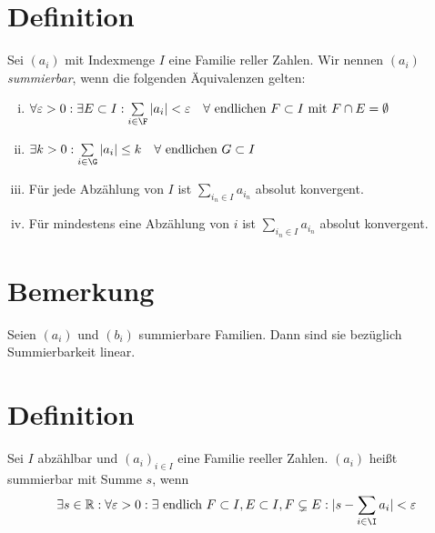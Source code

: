 \documentclass{scrreprt}
\newcommand{\RR}{\mathbb{R}}
\begin{document}
   	\section{Definition}
   	Sei $(a_i)$ mit Indexmenge $I$ eine Familie reller Zahlen. Wir nennen $(a_i)$ \emph{summierbar}, wenn die folgenden Äquivalenzen gelten:
	\begin{enumerate}[i)]
   		\item
   		$\forall \varepsilon > 0: \exists E \subset I: \sum\limits_{i \in \F} \vert a_i \vert < \varepsilon ~~~ \forall \text{ endlichen } F \subset I \text{ mit } F \cap E = \emptyset$
   		\item
   		$\exists k > 0 : \sum\limits_{i \in \G} \vert a_i \vert \leq k ~~~ \forall \text{ endlichen } G \subset I$
   		\item
   		Für jede Abzählung von $I$ ist $\sum\limits_{i_n \in I} a_{i_n}$ absolut konvergent.
   		\item
   		Für mindestens eine Abzählung von $i$ ist $\sum\limits_{i_n \in I} a_{i_n}$ absolut konvergent.
   	\end{enumerate}

   	\section{Bemerkung}
   	Seien $(a_i)$ und $(b_i)$ summierbare Familien. Dann sind sie bezüglich Summierbarkeit linear.

   	\section{Definition}
   	Sei $I$ abzählbar und $(a_i)_{i \in I}$ eine Familie reeller Zahlen. $(a_i)$ heißt summierbar mit Summe $s$, wenn
   	\begin{align*}
   		\exists s \in \RR: \forall \varepsilon > 0: \exists \text{ endlich } F \subset I, E \subset I, F \subsetneq E: \vert s - \sum\limits_{i \in \I} a_i \vert < \varepsilon
   	\end{align*}
\end{document}

